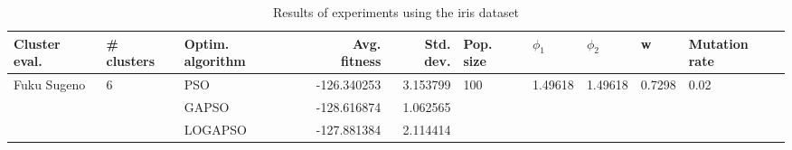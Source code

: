 \begin{table}
\centering
\caption{Results of experiments using the iris dataset}
\begin{tabular}{lllrrlllll}
\toprule
               Cluster eval. &        \# clusters & Optim. algorithm &  Avg. fitness &  Std. dev. &            Pop. size &               $\phi_{1}$ &               $\phi_{2}$ &                       w &         Mutation rate \\
\midrule
\multirow{3}{*}{Fuku Sugeno} & \multirow{3}{*}{6} &              PSO &   -126.340253 &   3.153799 & \multirow{3}{*}{100} & \multirow{3}{*}{1.49618} & \multirow{3}{*}{1.49618} & \multirow{3}{*}{0.7298} & \multirow{3}{*}{0.02} \\
                             &                    &            GAPSO &   -128.616874 &   1.062565 &                      &                          &                          &                         &                       \\
                             &                    &          LOGAPSO &   -127.881384 &   2.114414 &                      &                          &                          &                         &                       \\
\bottomrule
\end{tabular}
\end{table}

